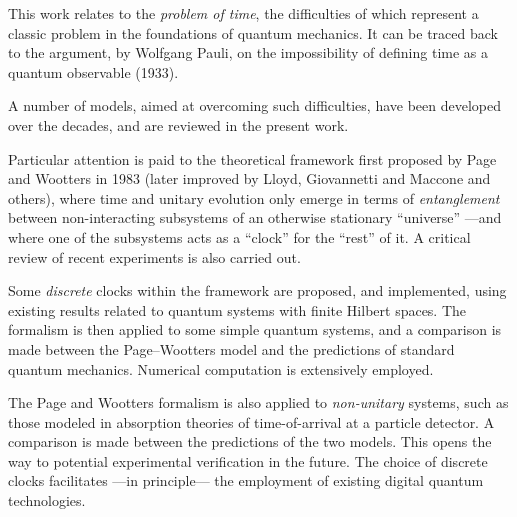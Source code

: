 This work relates to the
\emph{problem of time},
the difficulties of which
represent a classic problem in the foundations of quantum mechanics.
It can be traced back to
the argument, by Wolfgang Pauli,
on the impossibility of defining time as a quantum observable (1933).

A number of models, aimed at overcoming such difficulties,
have been developed over the decades,
and are reviewed in the present work.

Particular attention is paid to 
the theoretical framework first proposed by Page and Wootters in 1983
(later improved by Lloyd, Giovannetti and Maccone and others),
where time and unitary evolution only emerge in
terms of \emph{entanglement} between non-interacting subsystems
of an otherwise stationary ``universe''
---and where one of the subsystems acts as a ``clock'' for the ``rest'' of it.
A critical review
of recent experiments is also carried out.

Some \emph{discrete} clocks within the framework are proposed, and implemented,
using
existing results related to quantum systems with finite Hilbert spaces.
The formalism is then applied to some simple quantum systems,
and a comparison is made between the Page--Wootters model and the predictions
of standard quantum mechanics. 
Numerical computation is extensively employed.

The Page and Wootters formalism is also applied to \emph{non-unitary} systems,
such as those modeled in absorption theories of time-of-arrival at a particle detector.
A comparison is made between the predictions of the two models.
This opens the way to potential experimental verification in the future.
The choice of discrete clocks facilitates ---in principle--- the employment
of existing digital quantum technologies.
